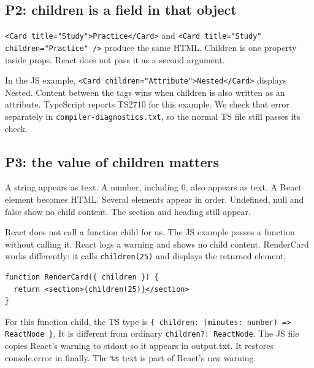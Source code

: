 \documentclass[
  10pt,
  a4paper,
]{article}
\begin{document}
\subsection{P2: children is a field in that
object}\label{p2-children-is-a-field-in-that-object}

\texttt{<Card title="Study">Practice</\allowbreak{}Card>} and
\texttt{<Card title="Study" children="Practice" /\allowbreak{}>} produce
the same HTML. Children is one property inside props. React does not
pass it as a second argument.

In the JS example,
\texttt{<Card children="Attribute">Nested</\allowbreak{}Card>} displays
Nested. Content between the tags wins when children is also written as
an attribute. TypeScript reports TS2710 for this example. We check that
error separately in \texttt{compiler-diagnostics.\allowbreak{}txt}, so
the normal TS file still passes its check.

\subsection{P3: the value of children
matters}\label{p3-the-value-of-children-matters}

A string appears as text. A number, including 0, also appears as text. A
React element becomes HTML. Several elements appear in order. Undefined,
null and false show no child content. The section and heading still
appear.

React does not call a function child for us. The JS example passes a
function without calling it. React logs a warning and shows no child
content. RenderCard works differently: it calls \texttt{children(25)}
and displays the returned element.

\begin{minipage}{\linewidth}

\begin{lstlisting}
function RenderCard({ children }) {
  return <section>{children(25)}</section>
}
\end{lstlisting}

\end{minipage}\par

For this function child, the TS type is
\texttt{\{ children:\allowbreak{} (minutes:\allowbreak{} number) => ReactNode \}}.
It is different from ordinary
\texttt{children?:\allowbreak{} ReactNode}. The JS file copies React's
warning to stdout so it appears in output.txt. It restores console.error
in finally. The \texttt{\%s} text is part of React's raw warning.
\end{document}
